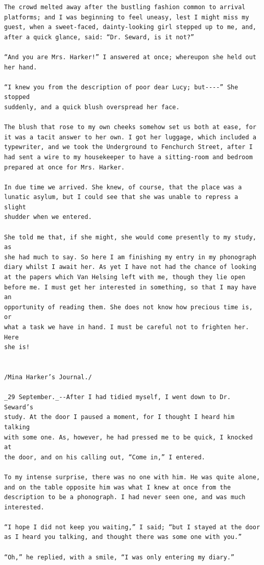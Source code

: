 \documentclass{article}
\begin{document}
\begin{verbatim}
The crowd melted away after the bustling fashion common to arrival
platforms; and I was beginning to feel uneasy, lest I might miss my
guest, when a sweet-faced, dainty-looking girl stepped up to me, and,
after a quick glance, said: “Dr. Seward, is it not?”

“And you are Mrs. Harker!” I answered at once; whereupon she held out
her hand.

“I knew you from the description of poor dear Lucy; but----” She stopped
suddenly, and a quick blush overspread her face.

The blush that rose to my own cheeks somehow set us both at ease, for
it was a tacit answer to her own. I got her luggage, which included a
typewriter, and we took the Underground to Fenchurch Street, after I
had sent a wire to my housekeeper to have a sitting-room and bedroom
prepared at once for Mrs. Harker.

In due time we arrived. She knew, of course, that the place was a
lunatic asylum, but I could see that she was unable to repress a slight
shudder when we entered.

She told me that, if she might, she would come presently to my study, as
she had much to say. So here I am finishing my entry in my phonograph
diary whilst I await her. As yet I have not had the chance of looking
at the papers which Van Helsing left with me, though they lie open
before me. I must get her interested in something, so that I may have an
opportunity of reading them. She does not know how precious time is, or
what a task we have in hand. I must be careful not to frighten her. Here
she is!


/Mina Harker’s Journal./

_29 September._--After I had tidied myself, I went down to Dr. Seward’s
study. At the door I paused a moment, for I thought I heard him talking
with some one. As, however, he had pressed me to be quick, I knocked at
the door, and on his calling out, “Come in,” I entered.

To my intense surprise, there was no one with him. He was quite alone,
and on the table opposite him was what I knew at once from the
description to be a phonograph. I had never seen one, and was much
interested.

“I hope I did not keep you waiting,” I said; “but I stayed at the door
as I heard you talking, and thought there was some one with you.”

“Oh,” he replied, with a smile, “I was only entering my diary.”


\end{verbatim}
\end{document}
